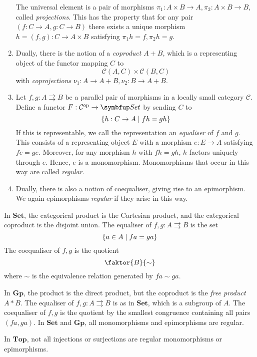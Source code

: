 \begin{enumerate}
    The universal element is a pair of morphisms \( \pi_1 : A \times B \to A, \pi_2 : A \times B \to B \), called \emph{projections}.
    This has the property that for any pair \( (f : C \to A, g : C \to B) \) there exists a unique morphism \( h = (f, g) : C \to A \times B \) satisfying \( \pi_1 h = f, \pi_2 h = g \).
    \item Dually, there is the notion of a \emph{coproduct} \( A + B \), which is a representing object of the functor mapping \( C \) to
    \[ \mathcal C(A, C) \times \mathcal C(B, C) \]
    with \emph{coprojections} \( \nu_1 : A \to A + B, \nu_2 : B \to A + B \).
    \item Let \( f, g : A \rightrightarrows B \) be a parallel pair of morphisms in a locally small category \( \mathcal C \).
    Define a functor \( F : \mathcal C^\cop \to \mathbf{Set} \) by sending \( C \) to
    \[ \qty{h : C \to A \mid fh = gh} \]
    If this is representable, we call the representation an \emph{equaliser} of \( f \) and \( g \).
    This consists of a representing object \( E \) with a morphism \( e : E \to A \) satisfying \( fe = ge \).
    Moreover, for any morphism \( h \) with \( fh = gh \), \( h \) factors uniquely through \( e \).
    Hence, \( e \) is a monomorphism.
    Monomorphisms that occur in this way are called \emph{regular}.
    \item Dually, there is also a notion of coequaliser, giving rise to an epimorphism.
    We again epimorphisms \emph{regular} if they arise in this way.
\end{enumerate}
In \( \mathbf{Set} \), the categorical product is the Cartesian product, and the categorical coproduct is the disjoint union.
The equaliser of \( f, g : A \rightrightarrows B \) is the set
\[ \qty{a \in A \mid fa = ga} \]
The coequaliser of \( f, g \) is the quotient
\[ \faktor{B}{\sim} \]
where \( \sim \) is the equivalence relation generated by \( fa \sim ga \).

In \( \mathbf{Gp} \), the product is the direct product, but the coproduct is the \emph{free product} \( A \ast B \).
The equaliser of \( f, g : A \rightrightarrows B \) is as in \( \mathbf{Set} \), which is a subgroup of \( A \).
The coequaliser of \( f, g \) is the quotient by the smallest congruence containing all pairs \( (fa, ga) \).
In \( \mathbf{Set} \) and \( \mathbf{Gp} \), all monomorphisms and epimorphisms are regular.

In \( \mathbf{Top} \), not all injections or surjections are regular monomorphisms or epimorphisms.

